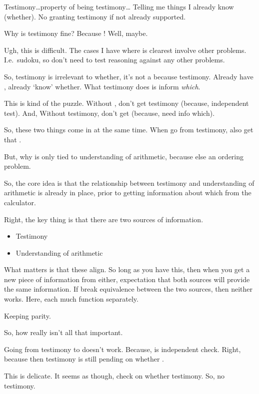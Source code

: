 \begin{note}
  Testimony\dots property of being testimony\dots
  Telling me things I already know (whether).
  No granting testimony if not already supported.


  Why is testimony fine?
  Because !
  Well, maybe.
  {
    \color{red}
    Ugh, this is difficult.
    The cases I have where  is clearest involve other problems.
    I.e.\ sudoku, so don't need to test reasoning against any other problems.

    So, testimony is irrelevant to whether, it's not a  because testimony.
    Already have , already `know' whether.
    What testimony does is inform \emph{which}.
  }

  {
    \color{red}
    This is kind of the puzzle.
    Without , don't get testimony (because, independent test).
    And,
    Without testimony, don't get  (because, need info which).

    So, these two things come in at the same time.
    When go from testimony, also get that .

    But, why is only tied to understanding of arithmetic, because else an ordering problem.

    So, the core idea is that the relationship between testimony and understanding of arithmetic is already in place, prior to getting information about which from the calculator.

    Right, the key thing is that there are two sources of information.
    \begin{itemize}
    \item
      Testimony
    \item
      Understanding of arithmetic
    \end{itemize}
    What matters is that these align.
    So long as you have this, then when you get a new piece of information from either, expectation that both sources will provide the same information.
    If break equivalence between the two sources, then neither works.
    Here, each much function separately.

    Keeping parity.

    So, how really isn't all that important.
  }

  Going from testimony to  doesn't work.
  Because,  is independent check.
  Right, because then testimony is still pending on whether .

  This is delicate.
  It seems as though, check on whether testimony.
  So, no testimony.


\end{note}
